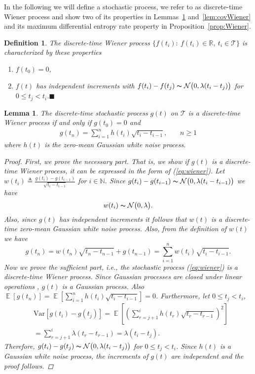 \documentclass{article}
\newtheorem{mydef}{Definition}
\newtheorem{lem}{Lemma}
\newcommand{\E}{\mathop{\mathbb E}}
\newcommand{\N}{\mathcal{N}}
\begin{document}
In the following we will define a stochastic process, we refer to as
discrete-time Wiener process and show two of its properties in
Lemmas~\ref{lem:Wiener} and~\ref{lem:covWiener} and its maximum
differential entropy rate property in
Proposition~\ref{prop:Wiener}.
\begin{mydef}
The discrete-time Wiener process $\{f(t_i):\ f(t_i)\in \mathbb{R},\  t_i \in \mathcal{T} \}$ is characterized by these properties
\begin{enumerate}
\item $f(t_0)=0$,
\item $f(t)$ has independent increments with $ f(t_i)-f(t_j)\thicksim \N\big(0, \lambda(t_i - t_j)\big)$  for $0 \le t_j < t_i$.\hfill $\blacksquare$\end{enumerate}
\end{mydef}
\begin{lem}
\label{lem:Wiener} The discrete-time stochastic process  $g(t)$ on
$\mathcal{T}$ is  a discrete-time Wiener process if and only if
$g(t_0)=0$ and
\begin{align}\label{eq:wiener}
g(t_n)=\sum_{i=1}^{n}{h(t_i)}\sqrt{t_i-t_{i-1}},&& \  n\geq1
\end{align}
where $h(t)$ is the zero-mean Gaussian white noise process.\begin{proof}
First, we prove the necessary part. That is, we show if $g(t)$ is a
discrete-time Wiener process, it can be expressed in the form of
(\ref{eq:wiener}). Let $w(t_i)\triangleq
\frac{g(t_i)-g(t_{i-1})}{\sqrt{t_i - t_{i-1}}}$ for
$i\in\mathbb{N}$. Since $ g(t_i)-g(t_{i-1})\thicksim \N\big(0,
\lambda(t_i - t_{i-1})\big)$ we have
\begin{equation}
w(t_i)\thicksim \N\big(0, \lambda\big).
\end{equation}
Also, since $g(t)$ has independent increments it follows that $w(t)$ is a
discrete-time zero-mean Gaussian white noise process. Also, from the
definition of $w(t)$ we have 
\small{\begin{equation}\nonumber
g(t_n)={w(t_n)}\sqrt{t_n-t_{n-1}}+g(t_{n-1})=\sum_{i=1}^{n}{w(t_i)}\sqrt{t_i-t_{i-1}}.
\end{equation}}\normalsize
Now we prove the sufficient part, i.e., the stochastic process
(\ref{eq:wiener}) is a discrete-time Wiener process. Since Gaussian
processes are closed under linear operations \cite{RasmussenW:06},
$g(t)$ is a Gaussian process. Also $\E[g(t_n)]=\E\left[\sum_{i=1}^{n}{h(t_i)}\sqrt{t_i-t_{i-1}}\right]=0$.
Furthermore, let $0 \le t_j < t_i$,
\begin{align}
&\text{Var}[g(t_i)-g(t_j)]=\E\left[\left(\sum_{r={j+1}}^{i}{h(t_r)\sqrt{t_r-t_{r-1}}}\right)^2\right]\nonumber\\
&=\sum_{r={j+1}}^{i}{\lambda ({t_r-t_{r-1}})}=\lambda (t_i-t_j).
\end{align}
Therefore, $ g(t_i)-g(t_j)\thicksim \N\big(0, \lambda(t_i -
t_j)\big)$  for $0 \le t_j < t_i$. Since $h(t)$ is a Gaussian white
noise process, the increments of $g(t)$ are independent and the proof
follows.
\end{proof}

\end{lem}
\end{document}

